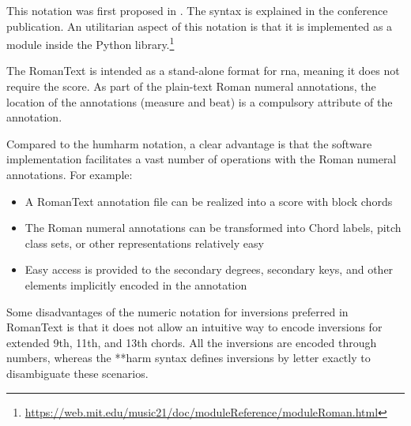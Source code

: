 

This notation was first proposed in
\textcite{gotham2019romantext}. The syntax is explained in
the conference publication. An utilitarian aspect of this
notation is that it is implemented as a module inside the
 Python
library.\footnote{\href{https://web.mit.edu/music21/doc/moduleReference/moduleRoman.html}{https://web.mit.edu/music21/doc/moduleReference/moduleRoman.html}}


The RomanText is intended as a stand-alone format for
\gls{rna}, meaning it does not require the score. As part of
the plain-text Roman numeral annotations, the location of
the annotations (measure and beat) is a compulsory attribute
of the annotation.

Compared to the \gls{humharm} notation, a clear advantage is
that the software implementation facilitates a vast number
of operations with the Roman numeral annotations. For
example:

\begin{itemize}
    \item A RomanText annotation file can be realized into a
    score with block chords
    \item The Roman numeral annotations can be transformed
    into Chord labels, pitch class sets, or other
    representations relatively easy
    \item Easy access is provided to the secondary degrees,
    secondary keys, and other elements implicitly encoded in
    the annotation
\end{itemize}

Some disadvantages of the numeric notation for inversions
preferred in RomanText is that it does not allow an
intuitive way to encode inversions for extended 9th, 11th,
and 13th chords. All the inversions are encoded through
numbers, whereas the **harm syntax defines inversions by
letter exactly to disambiguate these scenarios.
